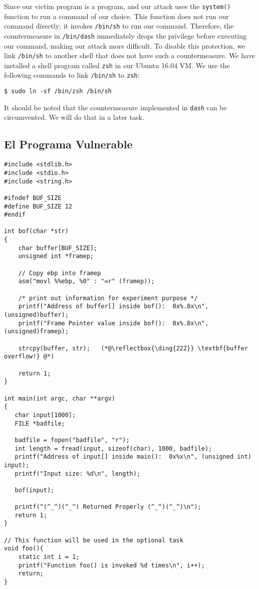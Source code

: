 Since our victim program is a \setuid program, and our
attack uses the \texttt{system()} function to run a command of our
choice. This function does not run our command directly; it 
invokes \texttt{/bin/sh} to run our command. Therefore, 
the countermeasure in \texttt{/bin/dash} immediately drops
the \setuid privilege before executing our command, making our 
attack more difficult. To disable this protection, 
we link \texttt{/bin/sh} to another shell that does not
have such a countermeasure.
We have installed a shell program
called \texttt{zsh} in our Ubuntu 16.04 VM. We use the following
commands to link \texttt{/bin/sh} to \texttt{zsh}:

\begin{lstlisting}
$ sudo ln -sf /bin/zsh /bin/sh
\end{lstlisting}


It should be noted that the countermeasure implemented in
\texttt{dash} can be circumvented. We will 
do that in a later task. 



\subsection{El Programa Vulnerable}
\label{sec:vulnerable_program}

\begin{lstlisting}[caption={The vulnerable program (\texttt{retlib.c})}]
#include <stdlib.h>
#include <stdio.h>
#include <string.h>

#ifndef BUF_SIZE
#define BUF_SIZE 12
#endif

int bof(char *str)
{
    char buffer[BUF_SIZE];
    unsigned int *framep;

    // Copy ebp into framep
    asm("movl %%ebp, %0" : "=r" (framep));      

    /* print out information for experiment purpose */
    printf("Address of buffer[] inside bof():  0x%.8x\n", (unsigned)buffer);
    printf("Frame Pointer value inside bof():  0x%.8x\n", (unsigned)framep);

    strcpy(buffer, str);   (*@\reflectbox{\ding{222}} \textbf{buffer overflow!} @*)

    return 1;
}

int main(int argc, char **argv)
{
   char input[1000];
   FILE *badfile;

   badfile = fopen("badfile", "r");
   int length = fread(input, sizeof(char), 1000, badfile);
   printf("Address of input[] inside main():  0x%x\n", (unsigned int) input);
   printf("Input size: %d\n", length);

   bof(input);

   printf("(^_^)(^_^) Returned Properly (^_^)(^_^)\n");
   return 1;
}

// This function will be used in the optional task
void foo(){
    static int i = 1;
    printf("Function foo() is invoked %d times\n", i++);
    return;
}
\end{lstlisting}

